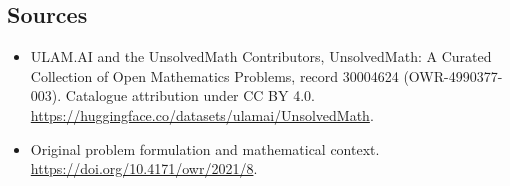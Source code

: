 \documentclass[11pt]{article}
\begin{document}
\subsection{Sources}
\begin{itemize}
\item[\hypertarget{source:30004624:1}{S1}] ULAM.AI and the UnsolvedMath Contributors, UnsolvedMath: A Curated Collection of Open Mathematics Problems, record 30004624 (OWR-4990377-003). Catalogue attribution under CC BY 4.0.
\url{https://huggingface.co/datasets/ulamai/UnsolvedMath}.
\item[\hypertarget{source:30004624:2}{S2}] Original problem formulation and mathematical context.
\url{https://doi.org/10.4171/owr/2021/8}.
\end{itemize}
\label{end:30004624}
\end{document}
